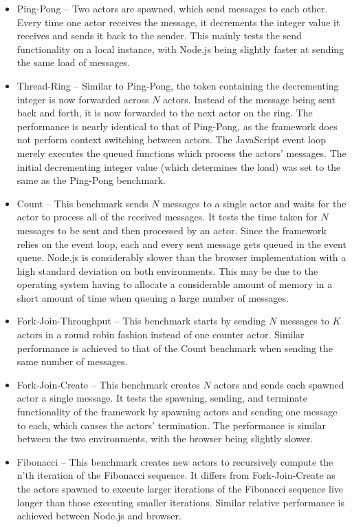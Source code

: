 \documentclass[oneside]{um-fict}
\begin{document}
\begin{itemize}
\item Ping-Pong – Two actors are spawned, which send messages to each other. Every time one actor receives the message, it decrements the integer value it receives and sends it back to the sender. This mainly tests the send functionality on a local instance, with Node.js being slightly faster at sending the same load of messages.
\item Thread-Ring – Similar to Ping-Pong, the token containing the decrementing integer is now forwarded across $N$ actors. Instead of the message being sent back and forth, it is now forwarded to the next actor on the ring. The performance is nearly identical to that of Ping-Pong, as the framework does not perform context switching between actors. The JavaScript event loop merely executes the queued functions which process the actors' messages. The initial decrementing integer value (which determines the load) was set to the same as the Ping-Pong benchmark.
\item Count – This benchmark sends $N$ messages to a single actor and waits for the actor to process all of the received messages. It tests the time taken for $N$ messages to be sent and then processed by an actor. Since the framework relies on the event loop, each and every sent message gets queued in the event queue. Node.js is considerably slower than the browser implementation with a high standard deviation on both environments. This may be due to the operating system having to allocate a considerable amount of memory in a short amount of time when queuing a large number of messages.
\item Fork-Join-Throughput – This benchmark starts by sending $N$ messages to $K$ actors in a round robin fashion instead of one counter actor. Similar performance is achieved to that of the Count benchmark when sending the same number of messages.
\item Fork-Join-Create – This benchmark creates $N$ actors and sends each spawned actor a single message. It tests the spawning, sending, and terminate functionality of the framework by spawning actors and sending one message to each, which causes the actors' termination. The performance is similar between the two environments, with the browser being slightly slower.
\item Fibonacci – This benchmark creates new actors to recursively compute the n'th iteration of the Fibonacci sequence. It differs from Fork-Join-Create as the actors spawned to execute larger iterations of the Fibonacci sequence live longer than those executing smaller iterations. Similar relative performance is achieved between Node.js and browser.

\end{itemize}
\end{document}
